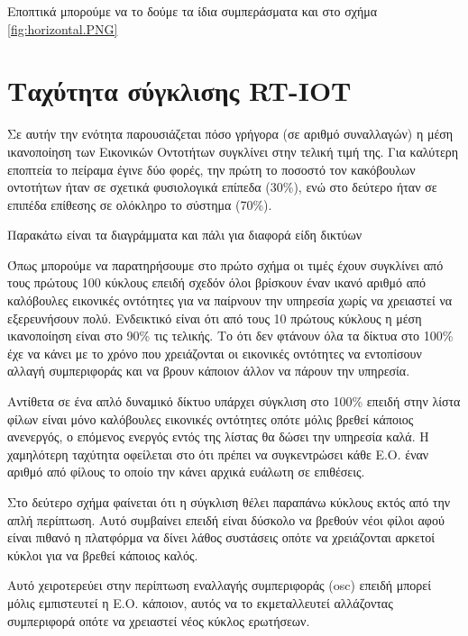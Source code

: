 Εποπτικά μπορούμε να το δούμε τα ίδια συμπεράσματα και στο σχήμα \ref{fig:horizontal.PNG}
 
\newpage
\section{Ταχύτητα σύγκλισης RT-IOT}

Σε αυτήν την ενότητα παρουσιάζεται πόσο γρήγορα (σε αριθμό συναλλαγών) η μέση ικανοποίηση των Εικονικών Οντοτήτων συγκλίνει στην τελική τιμή της. Για καλύτερη εποπτεία το πείραμα έγινε δύο φορές, την πρώτη το ποσοστό τον κακόβουλων οντοτήτων ήταν σε σχετικά φυσιολογικά επίπεδα (30\%), ενώ στο δεύτερο ήταν σε επιπέδα επίθεσης σε ολόκληρο το σύστημα (70\%). 

Παρακάτω είναι τα διαγράμματα και πάλι για διαφορά είδη δικτύων



Όπως μπορούμε να παρατηρήσουμε στο πρώτο σχήμα οι τιμές έχουν συγκλίνει από τους πρώτους 100 κύκλους επειδή σχεδόν όλοι βρίσκουν έναν ικανό αριθμό από καλόβουλες εικονικές οντότητες για να παίρνουν την υπηρεσία χωρίς να χρειαστεί να εξερευνήσουν πολύ. Ενδεικτικό είναι ότι από τους 10 πρώτους κύκλους η μέση ικανοποίηση είναι στο 90\% τις τελικής. Το ότι δεν φτάνουν όλα τα δίκτυα στο 100\% έχε να κάνει με το χρόνο που χρειάζονται οι εικονικές οντότητες να εντοπίσουν αλλαγή συμπεριφοράς και να βρουν κάποιον άλλον να πάρουν την υπηρεσία. 

Αντίθετα σε ένα απλό δυναμικό δίκτυο υπάρχει σύγκλιση στο 100\% επειδή στην λίστα φίλων είναι μόνο καλόβουλες εικονικές οντότητες οπότε μόλις βρεθεί κάποιος ανενεργός, ο επόμενος ενεργός εντός της λίστας θα δώσει την υπηρεσία καλά. Η χαμηλότερη ταχύτητα οφείλεται στο ότι πρέπει να συγκεντρώσει κάθε Ε.Ο. έναν αριθμό από φίλους το οποίο την κάνει αρχικά ευάλωτη σε επιθέσεις.

Στο δεύτερο σχήμα φαίνεται ότι η σύγκλιση θέλει παραπάνω κύκλους εκτός από την απλή περίπτωση. Αυτό συμβαίνει επειδή είναι δύσκολο να βρεθούν νέοι φίλοι αφού είναι πιθανό η πλατφόρμα να δίνει λάθος συστάσεις οπότε να χρειάζονται αρκετοί κύκλοι για να βρεθεί κάποιος καλός. 


Αυτό χειροτερεύει στην περίπτωση εναλλαγής συμπεριφοράς (osc) επειδή μπορεί μόλις εμπιστευτεί η Ε.Ο. κάποιον, αυτός να το εκμεταλλευτεί αλλάζοντας συμπεριφορά οπότε να χρειαστεί νέος κύκλος ερωτήσεων.
\newpage

